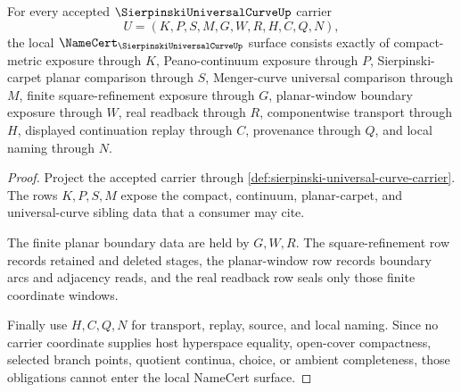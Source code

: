 \begin{theorem}
\label{thm:sierpinski-universal-curve-namecert-obligations}
For every accepted $\SierpinskiUniversalCurveUp$ carrier
$$
U=(K,P,S,M,G,W,R,H,C,Q,N),
$$
the local $\NameCert_{\SierpinskiUniversalCurveUp}$ surface consists exactly of compact-metric exposure through $K$, Peano-continuum exposure through $P$, Sierpinski-carpet planar comparison through $S$, Menger-curve universal comparison through $M$, finite square-refinement exposure through $G$, planar-window boundary exposure through $W$, real readback through $R$, componentwise transport through $H$, displayed continuation replay through $C$, provenance through $Q$, and local naming through $N$.
\end{theorem}
\begin{proof}
Project the accepted carrier through \autoref{def:sierpinski-universal-curve-carrier}. The rows $K,P,S,M$ expose the compact, continuum, planar-carpet, and universal-curve sibling data that a consumer may cite.

The finite planar boundary data are held by $G,W,R$. The square-refinement row records retained and deleted stages, the planar-window row records boundary arcs and adjacency reads, and the real readback row seals only those finite coordinate windows.

Finally use $H,C,Q,N$ for transport, replay, source, and local naming. Since no carrier coordinate supplies host hyperspace equality, open-cover compactness, selected branch points, quotient continua, choice, or ambient completeness, those obligations cannot enter the local NameCert surface.
\end{proof}

